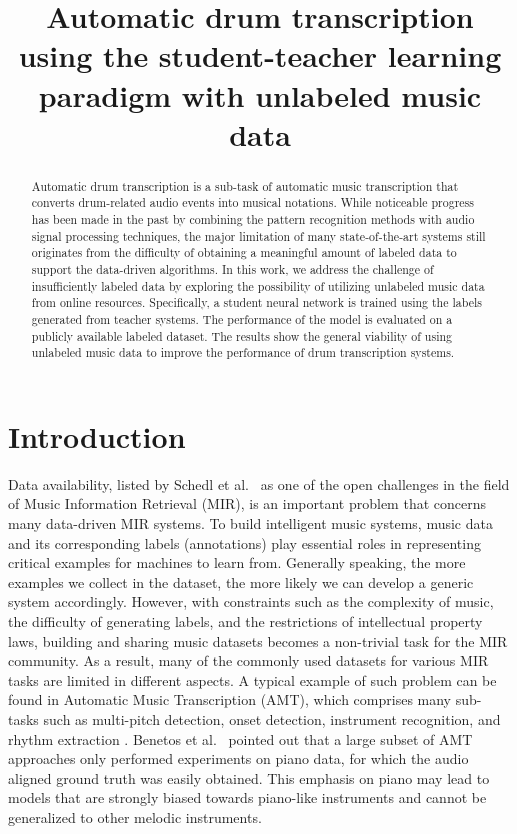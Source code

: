\documentclass{article}
\title{Automatic drum transcription using the student-teacher learning paradigm with unlabeled music data}
\begin{document}
%
\maketitle
%
\begin{abstract}
Automatic drum transcription is a sub-task of automatic music transcription that converts drum-related audio events into musical notations. While noticeable progress has been made in the past by combining the pattern recognition methods with audio signal processing techniques, the major limitation of many state-of-the-art systems still originates from the difficulty of obtaining a meaningful amount of labeled data to support the data-driven algorithms. In this work, we address the challenge of insufficiently labeled data by exploring the possibility of utilizing unlabeled music data from online resources. Specifically, a student neural network is trained using the labels generated from teacher systems. The performance of the model is evaluated on a publicly available labeled dataset. The results show the general viability of using unlabeled music data to improve the performance of drum transcription systems. 
\end{abstract}
%
\section{Introduction}
Data availability, listed by Schedl et al.~\cite{Schedl2014} as one of the open challenges in the field of Music Information Retrieval (MIR), is an important problem that concerns many data-driven MIR systems. To build intelligent music systems, music data and its corresponding labels (annotations) play essential roles in representing critical examples for machines to learn from. Generally speaking, the more examples we collect in the dataset, the more likely we can develop a generic system accordingly. However, with constraints such as the complexity of music, the difficulty of generating labels, and the restrictions of intellectual property laws, building and sharing music datasets becomes a non-trivial task for the MIR community. As a result, many of the commonly used datasets for various MIR tasks are limited in different aspects. A typical example of such problem can be found in Automatic Music Transcription (AMT), which comprises many sub-tasks such as multi-pitch detection, onset detection, instrument recognition, and rhythm extraction . Benetos et al.~\cite{Benetos2013} pointed out that a large subset of AMT approaches only performed experiments on piano data, for which the audio aligned ground truth was easily obtained. This emphasis on piano may lead to models that are strongly biased towards piano-like instruments and cannot be generalized to other melodic instruments. 
\end{document}
